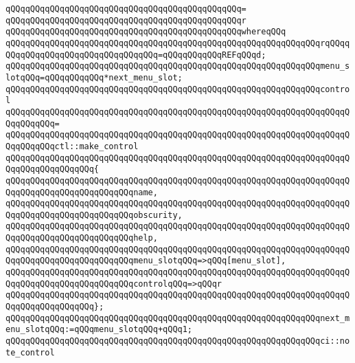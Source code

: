 \verb|qQQqqQQqqQQqqQQqqQQqqQQqqQQqqQQqqQQqqQQqqQQqqQQq=|\newline
\verb|qQQqqQQqqQQqqQQqqQQqqQQqqQQqqQQqqQQqqQQqqQQqqQQqr|\newline
\verb|qQQqqQQqqQQqqQQqqQQqqQQqqQQqqQQqqQQqqQQqqQQqqQQqwhereqQQq|\newline
\newline
\verb|qQQqqQQqqQQqqQQqqQQqqQQqqQQqqQQqqQQqqQQqqQQqqQQqqQQqqQQqqQQqqQQqrqQQqqQQqqQQqqQQqqQQqqQQqqQQqqQQqqQQq=qQQqqQQqqQQqREFqQQqd;|\newline
\verb|qQQqqQQqqQQqqQQqqQQqqQQqqQQqqQQqqQQqqQQqqQQqqQQqqQQqqQQqqQQqqQQqmenu_slotqQQq=qQQqqQQqqQQq*next_menu_slot;|\newline
\newline
\verb|qQQqqQQqqQQqqQQqqQQqqQQqqQQqqQQqqQQqqQQqqQQqqQQqqQQqqQQqqQQqqQQqcontrol|\newline
\verb|qQQqqQQqqQQqqQQqqQQqqQQqqQQqqQQqqQQqqQQqqQQqqQQqqQQqqQQqqQQqqQQqqQQqqQQqqQQqqQQq=|\newline
\verb|qQQqqQQqqQQqqQQqqQQqqQQqqQQqqQQqqQQqqQQqqQQqqQQqqQQqqQQqqQQqqQQqqQQqqQQqqQQqqQQqctl::make_control|\newline
\verb|qQQqqQQqqQQqqQQqqQQqqQQqqQQqqQQqqQQqqQQqqQQqqQQqqQQqqQQqqQQqqQQqqQQqqQQqqQQqqQQqqQQqqQQq{|\newline
\verb|qQQqqQQqqQQqqQQqqQQqqQQqqQQqqQQqqQQqqQQqqQQqqQQqqQQqqQQqqQQqqQQqqQQqqQQqqQQqqQQqqQQqqQQqqQQqqQQqname,|\newline
\verb|qQQqqQQqqQQqqQQqqQQqqQQqqQQqqQQqqQQqqQQqqQQqqQQqqQQqqQQqqQQqqQQqqQQqqQQqqQQqqQQqqQQqqQQqqQQqqQQqobscurity,|\newline
\verb|qQQqqQQqqQQqqQQqqQQqqQQqqQQqqQQqqQQqqQQqqQQqqQQqqQQqqQQqqQQqqQQqqQQqqQQqqQQqqQQqqQQqqQQqqQQqqQQqhelp,|\newline
\verb|qQQqqQQqqQQqqQQqqQQqqQQqqQQqqQQqqQQqqQQqqQQqqQQqqQQqqQQqqQQqqQQqqQQqqQQqqQQqqQQqqQQqqQQqqQQqqQQqmenu_slotqQQq=>qQQq[menu_slot],|\newline
\verb|qQQqqQQqqQQqqQQqqQQqqQQqqQQqqQQqqQQqqQQqqQQqqQQqqQQqqQQqqQQqqQQqqQQqqQQqqQQqqQQqqQQqqQQqqQQqqQQqcontrolqQQq=>qQQqr|\newline
\verb|qQQqqQQqqQQqqQQqqQQqqQQqqQQqqQQqqQQqqQQqqQQqqQQqqQQqqQQqqQQqqQQqqQQqqQQqqQQqqQQqqQQqqQQq};|\newline
\newline
\verb|qQQqqQQqqQQqqQQqqQQqqQQqqQQqqQQqqQQqqQQqqQQqqQQqqQQqqQQqqQQqqQQqnext_menu_slotqQQq:=qQQqmenu_slotqQQq+qQQq1;|\newline
\newline
\verb|qQQqqQQqqQQqqQQqqQQqqQQqqQQqqQQqqQQqqQQqqQQqqQQqqQQqqQQqqQQqqQQqci::note_control|\newline
